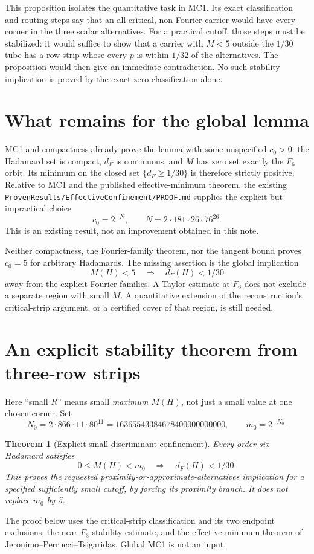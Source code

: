 \documentclass[11pt]{article}
\newtheorem{theorem}{Theorem}
\begin{document}
This proposition isolates the quantitative task in MC1. Its exact
classification and routing steps say that an all-critical, non-Fourier
carrier would have every corner in the three scalar alternatives.
For a practical cutoff, those steps must be stabilized: it would suffice
to show that a carrier with $M<5$ outside the $1/30$ tube has a row strip
whose every $p$ is within $1/32$ of the alternatives. The proposition
would then give an immediate contradiction. No such stability implication
is proved by the exact-zero classification alone.

\section{What remains for the global lemma}
MC1 and compactness already prove the lemma with some unspecified
$c_0>0$: the Hadamard set is compact, $d_F$ is continuous, and $M$ has
zero set exactly the $F_6$ orbit. Its minimum on the closed set
$\{d_F\ge1/30\}$ is therefore strictly positive.
Relative to MC1 and the published effective-minimum theorem, the existing
\texttt{ProvenResults/EffectiveConfinement/PROOF.md} supplies the explicit
but impractical choice
\[
 c_0=2^{-N},\qquad N=2\cdot181\cdot26\cdot76^{26}.
\]
This is an existing result, not an improvement obtained in this note.

Neither compactness, the Fourier-family theorem, nor the tangent bound
proves $c_0=5$ for arbitrary Hadamards. The missing assertion is the
global implication
\[
 \boxed{\quad M(H)<5\quad\Longrightarrow\quad d_F(H)<1/30\quad}
\]
away from the explicit Fourier families. A Taylor estimate at $F_6$
does not exclude a separate region with small $M$. A quantitative
extension of the reconstruction's critical-strip argument, or a certified
cover of that region, is still needed.

\section{An explicit stability theorem from three-row strips}
Here ``small $R$'' means small \emph{maximum} $M(H)$, not just a small
value at one chosen corner. Set
\[
 N_0=2\cdot866\cdot11\cdot80^{11}
 =16365543384678400000000000,\qquad m_0=2^{-N_0}.
\]
\begin{theorem}[Explicit small-discriminant confinement]
Every order-six Hadamard satisfies
\[
 0\le M(H)<m_0\quad\Longrightarrow\quad d_F(H)<1/30.\tag{14}
\]
This proves the requested proximity-or-approximate-alternatives implication
for a specified sufficiently small cutoff, by forcing its proximity branch.
It does \emph{not} replace $m_0$ by 5.
\end{theorem}
The proof below uses the critical-strip classification and its two endpoint
exclusions, the near-$F_3$ stability estimate, and the effective-minimum
theorem of Jeronimo--Perrucci--Tsigaridas. Global MC1 is not an input.
\end{document}
